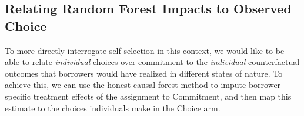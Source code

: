 \documentclass[oneside,11pt]{article}
\begin{document}





\subsection{Relating Random Forest Impacts to Observed Choice}
    
To more directly interrogate self-selection in this context, we would like to be able to relate \textit{individual} choices over commitment to the \textit{individual} counterfactual outcomes that borrowers would have realized in different states of nature.  To achieve this, we can use the honest causal forest method to impute borrower-specific treatment effects of the assignment to Commitment, and then map this estimate to the choices individuals make in the Choice arm.
\end{document}
